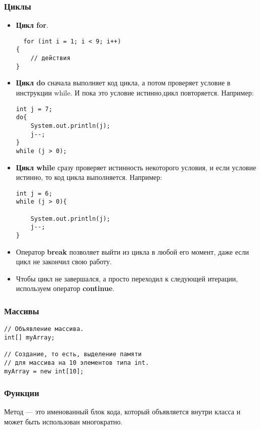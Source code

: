 \documentclass[12pt]{matmex-diploma}
\begin{document}
    \subsubsection*{Циклы}
        \begin{itemize}
            \item \textbf{Цикл for}.
                \begin{verbatim}
  for (int i = 1; i < 9; i++)
{
    // действия
}
		        \end{verbatim}
		    \item \textbf{Цикл do} сначала выполняет код цикла, а потом проверяет условие в инструкции while. И пока это условие истинно,цикл повторяется. Например:
                \begin{verbatim}
int j = 7;
do{
    System.out.println(j);
    j--;
}
while (j > 0);
		        \end{verbatim}  
		   \item \textbf{Цикл while} сразу проверяет истинность некоторого условия, и если условие истинно, то код цикла выполняется. Например:    
                \begin{verbatim}
int j = 6;
while (j > 0){
 
    System.out.println(j);
    j--;
}
		        \end{verbatim}  
           \item Оператор \textbf{break} позволяет выйти из цикла в любой его момент, даже если цикл не закончил свою работу.
           \item Чтобы цикл не завершался, а просто переходил к следующей итерации, используем оператор \textbf{continue}.
        \end{itemize}
        
    \subsubsection*{Массивы}
                \begin{verbatim}
// Объявление массива.
int[] myArray;

// Cоздание, то есть, выделение памяти 
// для массива на 10 элементов типа int.
myArray = new int[10];
		        \end{verbatim}      
    
    \subsubsection*{Функции}
        Метод — это именованный блок кода, который объявляется внутри класса и может быть использован многократно.
\end{document}
